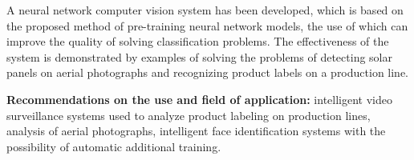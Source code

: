 \documentclass{thesisby}
\begin{document}
A neural network computer vision system has been developed, which is based on the proposed method of pre-training neural network models, the use of which can improve the quality of solving classification problems. The effectiveness of the system is demonstrated by examples of solving the problems of detecting solar panels on aerial photographs and recognizing product labels on a production line.

\textbf{Recommendations on the use and field of application:}
intelligent video surveillance systems used to analyze product labeling on production lines, analysis of aerial photographs, intelligent face identification systems with the possibility of automatic additional training.





 

 
 






\end{document}

